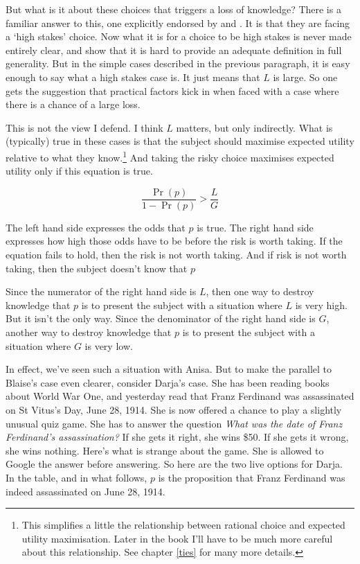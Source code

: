 \documentclass[11pt,]{book}
\let\rmarkdownfootnote\footnote%
\def\footnote{\protect\rmarkdownfootnote}
\begin{document}
But what is it about these choices that triggers a loss of knowledge? There is a familiar answer to this, one explicitly endorsed by \citet{Hawthorne2004} and \citet{Stanley2005}. It is that they are facing a `high stakes' choice. Now what it is for a choice to be high stakes is never made entirely clear, and \citet{AndersonHawthorne2019a} show that it is hard to provide an adequate definition in full generality. But in the simple cases described in the previous paragraph, it is easy enough to say what a high stakes case is. It just means that \(L\) is large. So one gets the suggestion that practical factors kick in when faced with a case where there is a chance of a large loss.

This is not the view I defend. I think \(L\) matters, but only indirectly. What is (typically) true in these cases is that the subject should maximise expected utility relative to what they know.\footnote{This simplifies a little the relationship between rational choice and expected utility maximisation. Later in the book I'll have to be much more careful about this relationship. See chapter \ref{ties} for many more details.} And taking the risky choice maximises expected utility only if this equation is true.

\[
\frac{\Pr(p)}{1 - \Pr(p)} > \frac{L}{G}
\]

The left hand side expresses the odds that \(p\) is true. The right hand side expresses how high those odds have to be before the risk is worth taking. If the equation fails to hold, then the risk is not worth taking. And if risk is not worth taking, then the subject doesn't know that \(p\)

Since the numerator of the right hand side is \(L\), then one way to destroy knowledge that \(p\) is to present the subject with a situation where \(L\) is very high. But it isn't the only way. Since the denominator of the right hand side is \(G\), another way to destroy knowledge that \(p\) is to present the subject with a situation where \(G\) is very low.

In effect, we've seen such a situation with Anisa. But to make the parallel to Blaise's case even clearer, consider Darja's case. She has been reading books about World War One, and yesterday read that Franz Ferdinand was assassinated on St Vitus's Day, June 28, 1914. She is now offered a chance to play a slightly unusual quiz game. She has to answer the question \emph{What was the date of Franz Ferdinand's assassination?} If she gets it right, she wins \$50. If she gets it wrong, she wins nothing. Here's what is strange about the game. She is allowed to Google the answer before answering. So here are the two live options for Darja. In the table, and in what follows, \(p\) is the proposition that Franz Ferdinand was indeed assassinated on June 28, 1914.
\end{document}
